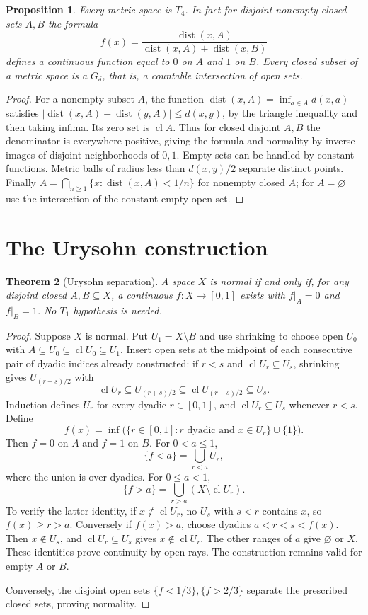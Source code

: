 \documentclass[11pt,oneside,openany]{book}
\newtheorem{theorem}{Theorem}[chapter]
\newtheorem{proposition}[theorem]{Proposition}
\theoremstyle{definition}
\theoremstyle{remark}
\DeclareMathOperator{\cl}{cl}
\DeclareMathOperator{\dist}{dist}
\begin{document}
\begin{proposition}\label{d10:07:metric-normal}
Every metric space is $T_4$. In fact for disjoint nonempty closed sets $A,B$ the formula
\[
 f(x)=\frac{\dist(x,A)}{\dist(x,A)+\dist(x,B)}
\]
defines a continuous function equal to $0$ on $A$ and $1$ on $B$. Every closed subset of a metric space is a $G_\delta$, that is, a countable intersection of open sets.
\end{proposition}
\begin{proof}
For a nonempty subset $A$, the function $\dist(x,A)=\inf_{a\in A}d(x,a)$ satisfies $|\dist(x,A)-\dist(y,A)|\leq d(x,y)$, by the triangle inequality and then taking infima. Its zero set is $\cl A$. Thus for closed disjoint $A,B$ the denominator is everywhere positive, giving the formula and normality by inverse images of disjoint neighborhoods of $0,1$. Empty sets can be handled by constant functions. Metric balls of radius less than $d(x,y)/2$ separate distinct points. Finally $A=\bigcap_{n\geq1}\{x:\dist(x,A)<1/n\}$ for nonempty closed $A$; for $A=\varnothing$ use the intersection of the constant empty open set.
\end{proof}

\section{The Urysohn construction}
\begin{theorem}[Urysohn separation]\label{d10:07:urysohn}
A space $X$ is normal if and only if, for any disjoint closed $A,B\subseteq X$, a continuous $f:X\to[0,1]$ exists with $f|_A=0$ and $f|_B=1$. No $T_1$ hypothesis is needed.
\end{theorem}
\begin{proof}
Suppose $X$ is normal. Put $U_1=X\setminus B$ and use shrinking to choose open $U_0$ with $A\subseteq U_0\subseteq\cl U_0\subseteq U_1$. Insert open sets at the midpoint of each consecutive pair of dyadic indices already constructed: if $r<s$ and $\cl U_r\subseteq U_s$, shrinking gives $U_{(r+s)/2}$ with
\[
 \cl U_r\subseteq U_{(r+s)/2}\subseteq\cl U_{(r+s)/2}\subseteq U_s.
\]
Induction defines $U_r$ for every dyadic $r\in[0,1]$, and $\cl U_r\subseteq U_s$ whenever $r<s$. Define
\[
 f(x)=\inf\bigl(\{r\in[0,1]:r\text{ dyadic and }x\in U_r\}\cup\{1\}\bigr).
\]
Then $f=0$ on $A$ and $f=1$ on $B$. For $0<a\leq1$,
\[
 \{f<a\}=\bigcup_{r<a}U_r,
\]
where the union is over dyadics. For $0\leq a<1$,
\[
 \{f>a\}=\bigcup_{r>a}(X\setminus\cl U_r).
\]
To verify the latter identity, if $x\notin\cl U_r$, no $U_s$ with $s<r$ contains $x$, so $f(x)\geq r>a$. Conversely if $f(x)>a$, choose dyadics $a<r<s<f(x)$. Then $x\notin U_s$, and $\cl U_r\subseteq U_s$ gives $x\notin\cl U_r$. The other ranges of $a$ give $\varnothing$ or $X$. These identities prove continuity by open rays. The construction remains valid for empty $A$ or $B$.

Conversely, the disjoint open sets $\{f<1/3\},\{f>2/3\}$ separate the prescribed closed sets, proving normality.
\end{proof}
\end{document}
